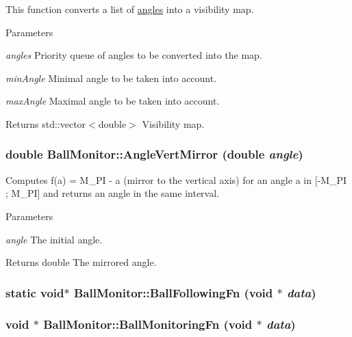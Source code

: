 This function converts a list of \hyperlink{structBallMonitor_1_1Angle}{angles} into a visibility map. 


\begin{DoxyParams}{Parameters}
\item[{\em angles}]Priority queue of angles to be converted into the map. \item[{\em minAngle}]Minimal angle to be taken into account. \item[{\em maxAngle}]Maximal angle to be taken into account. \end{DoxyParams}
\begin{DoxyReturn}{Returns}
std::vector$<$double$>$ Visibility map. 
\end{DoxyReturn}
\hypertarget{classBallMonitor_a32d7b6d877b84c7d7fd9bc9ffe659562}{
\subsubsection[{AngleVertMirror}]{\setlength{\rightskip}{0pt plus 5cm}double BallMonitor::AngleVertMirror (double {\em angle})}}
\label{classBallMonitor_a32d7b6d877b84c7d7fd9bc9ffe659562}


Computes f(a) = M\_\-PI -\/ a (mirror to the vertical axis) for an angle a in \mbox{[}-\/M\_\-PI ; M\_\-PI\mbox{]} and returns an angle in the same interval. 


\begin{DoxyParams}{Parameters}
\item[{\em angle}]The initial angle. \end{DoxyParams}
\begin{DoxyReturn}{Returns}
double The mirrored angle. 
\end{DoxyReturn}
\hypertarget{classBallMonitor_a2ca3e25f437b5aabb3bc88e0f84cf9a5}{
\subsubsection[{BallFollowingFn}]{\setlength{\rightskip}{0pt plus 5cm}static void$\ast$ BallMonitor::BallFollowingFn (void $\ast$ {\em data})}}
\label{classBallMonitor_a2ca3e25f437b5aabb3bc88e0f84cf9a5}
\hypertarget{classBallMonitor_af76da8bc13e92d9083a9a77469c472df}{
\subsubsection[{BallMonitoringFn}]{\setlength{\rightskip}{0pt plus 5cm}void $\ast$ BallMonitor::BallMonitoringFn (void $\ast$ {\em data})}}
\label{classBallMonitor_af76da8bc13e92d9083a9a77469c472df}


